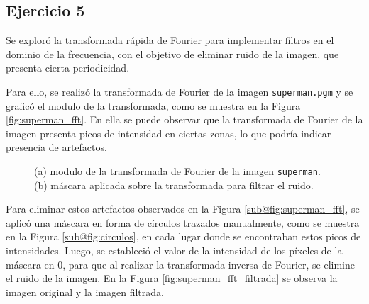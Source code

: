 \documentclass[11pt, twocolumn]{article}
\begin{document}
\subsection*{Ejercicio 5}
Se exploró la transformada rápida de Fourier para implementar filtros en el dominio de la frecuencia, con el objetivo de eliminar ruido de la imagen, que presenta cierta periodicidad. 

Para ello, se realizó la transformada de Fourier de la imagen \texttt{superman.pgm} y se graficó el modulo de la transformada, como se muestra en la Figura \ref{fig:superman_fft}. En ella se puede observar que la transformada de Fourier de la imagen presenta picos de intensidad en ciertas zonas, lo que podría indicar presencia de artefactos.

\begin{figure}[htbp]
  \centering
  \hfill
  \hfill
  \caption{(a) modulo de la transformada de Fourier de la imagen \texttt{superman}. (b) máscara aplicada sobre la transformada para filtrar el ruido.}
  \label{fig:figuras_fft_ej_5}
\end{figure}

Para eliminar estos artefactos observados en la Figura \ref{sub@fig:superman_fft}, se aplicó una máscara en forma de círculos trazados manualmente, como se muestra en la Figura \ref{sub@fig:circulos}, en cada lugar donde se encontraban estos picos de intensidades. Luego, se estableció el valor de la intensidad de los píxeles de la máscara en $0$, para que al realizar la transformada inversa de Fourier, se elimine el ruido de la imagen. En la Figura \ref{fig:superman_fft_filtrada} se observa la imagen original y la imagen filtrada.
\end{document}
